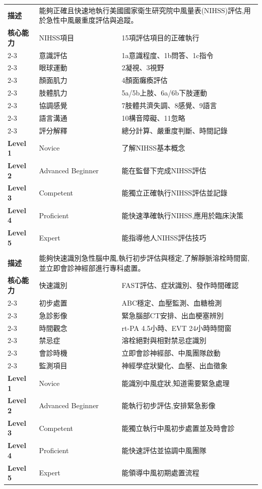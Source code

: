 \documentclass[12pt,a4paper]{article}
\begin{document}
\begin{longtable}{|p{1.2cm}|p{3.8cm}|p{8.5cm}|}
\rowcolor{neuro_blue!10}
\multicolumn{3}{|c|}{\textbf{EPA 2: NIHSS評估}} \\
\hline
\textbf{描述} & \multicolumn{2}{|p{12.5cm}|}{能夠正確且快速地執行美國國家衛生研究院中風量表(NIHSS)評估,用於急性中風嚴重度評估與追蹤。} \\
\hline
\textbf{核心能力} & NIHSS項目 & 15項評估項目的正確執行 \\
\cline{2-3}
& 意識評估 & 1a意識程度、1b問答、1c指令 \\
\cline{2-3}
& 眼球運動 & 2凝視、3視野 \\
\cline{2-3}
& 顏面肌力 & 4顏面癱瘓評估 \\
\cline{2-3}
& 肢體肌力 & 5a/5b上肢、6a/6b下肢運動 \\
\cline{2-3}
& 協調感覺 & 7肢體共濟失調、8感覺、9語言 \\
\cline{2-3}
& 語言溝通 & 10構音障礙、11忽略 \\
\cline{2-3}
& 評分解釋 & 總分計算、嚴重度判斷、時間記錄 \\
\hline
\textbf{Level 1} & Novice & 了解NIHSS基本概念 \\
\hline
\textbf{Level 2} & Advanced Beginner & 能在監督下完成NIHSS評估 \\
\hline
\textbf{Level 3} & Competent & 能獨立正確執行NIHSS評估並記錄 \\
\hline
\textbf{Level 4} & Proficient & 能快速準確執行NIHSS,應用於臨床決策 \\
\hline
\textbf{Level 5} & Expert & 能指導他人NIHSS評估技巧 \\
\hline

\rowcolor{neuro_blue!10}
\multicolumn{3}{|c|}{\textbf{EPA 3: 急性腦中風初步處置}} \\
\hline
\textbf{描述} & \multicolumn{2}{|p{12.5cm}|}{能夠快速識別急性腦中風,執行初步評估與穩定,了解靜脈溶栓時間窗,並立即會診神經部進行專科處置。} \\
\hline
\textbf{核心能力} & 快速識別 & FAST評估、症狀識別、發作時間確認 \\
\cline{2-3}
& 初步處置 & ABC穩定、血壓監測、血糖檢測 \\
\cline{2-3}
& 急診影像 & 緊急腦部CT安排、出血梗塞辨別 \\
\cline{2-3}
& 時間觀念 & rt-PA 4.5小時、EVT 24小時時間窗 \\
\cline{2-3}
& 禁忌症 & 溶栓絕對與相對禁忌症識別 \\
\cline{2-3}
& 會診時機 & 立即會診神經部、中風團隊啟動 \\
\cline{2-3}
& 監測項目 & 神經學症狀變化、血壓、出血徵象 \\
\hline
\textbf{Level 1} & Novice & 能識別中風症狀,知道需要緊急處理 \\
\hline
\textbf{Level 2} & Advanced Beginner & 能執行初步評估,安排緊急影像 \\
\hline
\textbf{Level 3} & Competent & 能獨立執行中風初步處置並及時會診 \\
\hline
\textbf{Level 4} & Proficient & 能快速評估並協調中風團隊 \\
\hline
\textbf{Level 5} & Expert & 能領導中風初期處置流程 \\
\hline


\end{longtable}
\end{document}
